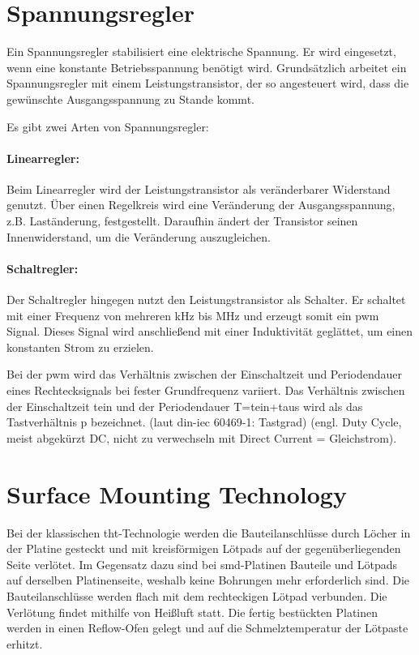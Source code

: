 \section{Spannungsregler}
Ein Spannungsregler stabilisiert eine elektrische Spannung.
Er wird eingesetzt, wenn eine konstante Betriebsspannung benötigt wird.
Grundsätzlich arbeitet ein Spannungsregler mit einem Leistungstransistor, der so angesteuert wird, dass die gewünschte Ausgangsspannung zu Stande kommt.\par

Es gibt zwei Arten von Spannungsregler:
\paragraph{Linearregler:}
Beim Linearregler wird der Leistungstransistor als veränderbarer Widerstand genutzt.
Über einen Regelkreis wird eine Veränderung der Ausgangsspannung, z.B. Laständerung, festgestellt.
Daraufhin ändert der Transistor seinen Innenwiderstand, um die Veränderung auszugleichen.\par

\paragraph{Schaltregler:}
Der Schaltregler hingegen nutzt den Leistungstransistor als Schalter.
Er schaltet mit einer Frequenz von mehreren kHz bis MHz und erzeugt somit ein \ac{pwm} Signal.
Dieses Signal wird anschließend mit einer Induktivität geglättet, um einen konstanten Strom zu erzielen.\par

Bei der \ac{pwm} wird das Verhältnis zwischen der Einschaltzeit und Periodendauer eines Rechtecksignals bei fester Grundfrequenz variiert. Das Verhältnis zwischen der Einschaltzeit tein und der Periodendauer T=tein+taus wird als das Tastverhältnis p bezeichnet. (laut \ac{din}-\ac{iec} 60469-1: Tastgrad) (engl. Duty Cycle, meist abgekürzt DC, nicht zu verwechseln mit Direct Current = Gleichstrom). \cite[Einleitung]{mikrocontroller-spannungsregler}\par

\section{Surface Mounting Technology}
Bei der klassischen \ac{tht}-Technologie werden die Bauteilanschlüsse durch Löcher in der Platine gesteckt und mit kreisförmigen Lötpads auf der gegenüberliegenden Seite verlötet.
Im Gegensatz dazu sind bei \ac{smd}-Platinen Bauteile und Lötpads auf derselben Platinenseite, weshalb keine Bohrungen mehr erforderlich sind.
Die Bauteilanschlüsse werden flach mit dem rechteckigen Lötpad verbunden.
Die Verlötung findet mithilfe von Heißluft statt.
Die fertig bestückten Platinen werden in einen Reflow-Ofen gelegt und auf die Schmelztemperatur der Lötpaste erhitzt.

